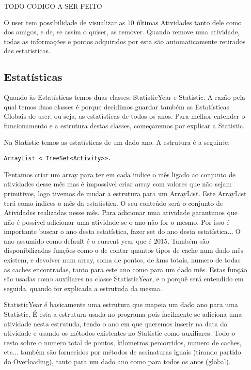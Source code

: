 \documentclass{article}
\begin{document}
TODO CODIGO A SER FEITO
\par O user tem possibilidade de visualizar as 10 últimas Atividades tanto dele como dos amigos, e de, se assim o quiser, as remover. Quando remove uma atividade, todas as informações e pontos adquiridos por esta são automaticamente retirados das estatisticas.


\subsection{Estatísticas}
\quad Quando às Estatísticas temos duas classes: StatisticYear e Statistic.
A razão pela qual temos duas classes é porque decidimos guardar também as Estatísticas Globais do user, ou seja, as estatísticas de todos os anos. Para melhor entender o funcionamento e a estrutura destas classes, começaremos por explicar a Statistic.

\par Na Statistic temos as estatísticas de um dado ano. A estrutura é a seguinte:
\begin{lstlisting}
ArrayList < TreeSet<Activity>>.
\end{lstlisting}

Tentamos criar um array para ter em cada indice o mês ligado ao conjunto de atividades desse mês mas é impossivel criar array com valores que não sejam primitivos, logo tivemos de mudar a estrutura para um ArrayList. Este ArrayList terá como indices o mês da estatistica. O seu conteúdo será o conjunto de Atividades realizadas nesse mês. Para adicionar uma atividade garantimos que não é possivel adicionar uma atividade se o ano não for o mesmo. Por isso é importante buscar o ano desta estatística, fazer set do ano desta estatística... O ano assumido como default é o current year que é 2015. Também são disponibilizadas funções como o de contar quantos tipos de cache num dado mês existem, e devolver num array, soma de pontos, de kms totais, numero de todas as caches encontradas, tanto para este ano como para um dado mês. Estas função são usadas como auxiliares na classe StatisticYear, e o porquê será entendido em seguida, quando for explicada a estrutuda da mesma.
\par StatisticYear é basicamente uma estrutura que mapeia um dado ano para uma Statistic. É esta a estrutura usada no programa pois facilmente se adiciona uma atividade nesta estrutuda, tendo o ano em que queremos inserir na data da atividade e usando os métodos existentes no Statistic como auxiliares. Todo o resto sobre o numero total de pontos, kilometros percorridos, numero de caches, etc... também são fornecidos por métodos de assinaturas iguais (tirando partido do Overloading), tanto para um dado ano como para todos os anos (global).
\end{document}
